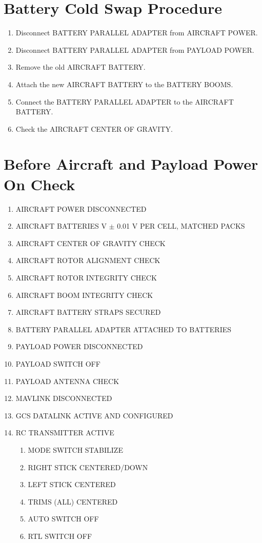 \documentclass{report}
\begin{document}
	\section{Battery Cold Swap Procedure}
		\begin{enumerate}
			\item Disconnect BATTERY PARALLEL ADAPTER from AIRCRAFT POWER.
			\item Disconnect BATTERY PARALLEL ADAPTER from PAYLOAD POWER.
			\item Remove the old AIRCRAFT BATTERY.
			\item Attach the new AIRCRAFT BATTERY to the BATTERY BOOMS.
			\item Connect the BATTERY PARALLEL ADAPTER to the AIRCRAFT BATTERY.
			\item Check the AIRCRAFT CENTER OF GRAVITY.
		\end{enumerate}
	\section{Before Aircraft and Payload Power On Check}
		\begin{enumerate}
			\item AIRCRAFT POWER \hrulefill DISCONNECTED
			\item AIRCRAFT BATTERIES  V $\pm$ 0.01 V PER CELL, MATCHED PACKS
			\item AIRCRAFT CENTER OF GRAVITY \hrulefill CHECK
			\item AIRCRAFT ROTOR ALIGNMENT \hrulefill CHECK
			\item AIRCRAFT ROTOR INTEGRITY \hrulefill CHECK
			\item AIRCRAFT BOOM INTEGRITY \hrulefill CHECK
			\item AIRCRAFT BATTERY STRAPS \hrulefill SECURED
			\item BATTERY PARALLEL ADAPTER \hrulefill ATTACHED TO BATTERIES
			\item PAYLOAD POWER \hrulefill DISCONNECTED
			\item PAYLOAD SWITCH \hrulefill OFF
			\item PAYLOAD ANTENNA \hrulefill CHECK
			\item MAVLINK \hrulefill DISCONNECTED
			\item GCS DATALINK \hrulefill ACTIVE AND CONFIGURED
			\item RC TRANSMITTER \hrulefill ACTIVE
			\begin{enumerate}
				\item MODE SWITCH \hrulefill STABILIZE
				\item RIGHT STICK \hrulefill CENTERED/DOWN
				\item LEFT STICK \hrulefill CENTERED
				\item TRIMS (ALL) \hrulefill CENTERED
				\item AUTO SWITCH \hrulefill OFF
				\item RTL SWITCH \hrulefill OFF
			\end{enumerate}
		\end{enumerate}
\end{document}
